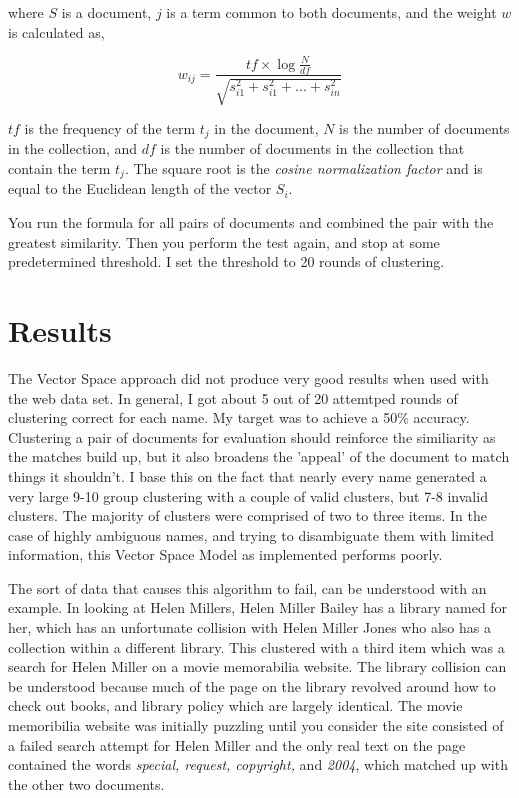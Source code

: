 \documentclass[12pt,twoside,letterpaper]{article}
\begin{document}
where $S$ is a document, $j$ is a term common to both documents, and the weight $w$ is calculated as,

$$w_{ij} = \frac{tf \times \log{\frac{N}{df}}}{\sqrt{s_{i1}^2 + s_{i1}^2 + ... + s_{in}^2}}$$

$tf$ is the frequency of the term $t_j$ in the document, $N$ is the number of documents in the collection, and $df$ is the number of documents in the collection that contain the term $t_j$. The square root is the \textit{cosine normalization factor} and is equal to the Euclidean length of the vector $S_i$.

You run the formula for all pairs of documents and combined the pair with the greatest similarity. Then you perform the test again, and stop at some predetermined threshold. I set the threshold to 20 rounds of clustering.

\section{Results}
The Vector Space approach did not produce very good results when used with the web data set. In general, I got about 5 out of 20 attemtped rounds of clustering correct for each name. My target was to achieve a 50\% accuracy. Clustering a pair of documents for evaluation should reinforce the similiarity as the matches build up, but it also broadens the 'appeal' of the document to match things it shouldn't. I base this on the fact that nearly every name generated a very large 9-10 group clustering with a couple of valid clusters, but 7-8 invalid clusters. The majority of clusters were comprised of two to three items. In the case of highly ambiguous names, and trying to disambiguate them with limited information, this Vector Space Model as implemented performs poorly.

The sort of data that causes this algorithm to fail, can be understood with an example. In looking at Helen Millers, Helen Miller Bailey has a library named for her, which has an unfortunate collision with Helen Miller Jones who also has a collection within a different library. This clustered with a third item which was a search for Helen Miller on a movie memorabilia website. The library collision can be understood because much of the page on the library revolved around how to check out books, and library policy which are largely identical. The movie memoribilia website was initially puzzling until you consider the site consisted of a failed search attempt for Helen Miller and the only real text on the page contained the words \textit{special, request, copyright,} and \textit{2004}, which matched up with the other two documents.
\end{document}
